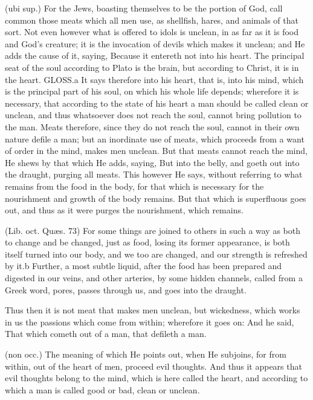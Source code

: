  (ubi sup.) For the Jews, boasting themselves to be the portion of God, call common those meats which all men use, as shellfish, hares, and animals of that sort. Not even however what is offered to idols is unclean, in as far as it is food and God’s creature; it is the invocation of devils which makes it unclean; and He adds the cause of it, saying, Because it entereth not into his heart. The principal seat of the soul according to Plato is the brain, but according to Christ, it is in the heart. GLOSS.a It says therefore into his heart, that is, into his mind, which is the principal part of his soul, on which his whole life depends; wherefore it is necessary, that according to the state of his heart a man should be called clean or unclean, and thus whatsoever does not reach the soul, cannot bring pollution to the man. Meats therefore, since they do not reach the soul, cannot in their own nature defile a man; but an inordinate use of meats, which proceeds from a want of order in the mind, makes men unclean. But that meats cannot reach the mind, He shews by that which He adds, saying, But into the belly, and goeth out into the draught, purging all meats. This however He says, without referring to what remains from the food in the body, for that which is necessary for the nourishment and growth of the body remains. But that which is superfluous goes out, and thus as it were purges the nourishment, which remains.

 (Lib. oct. Quæs. 73) For some things are joined to others in such a way as both to change and be changed, just as food, losing its former appearance, is both itself turned into our body, and we too are changed, and our strength is refreshed by it.b Further, a most subtle liquid, after the food has been prepared and digested in our veins, and other arteries, by some hidden channels, called from a Greek word, pores, passes through us, and goes into the draught.

 Thus then it is not meat that makes men unclean, but wickedness, which works in us the passions which come from within; wherefore it goes on: And he said, That which cometh out of a man, that defileth a man.

 (non occ.) The meaning of which He points out, when He subjoins, for from within, out of the heart of men, proceed evil thoughts. And thus it appears that evil thoughts belong to the mind, which is here called the heart, and according to which a man is called good or bad, clean or unclean.

